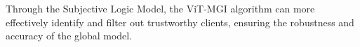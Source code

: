 \documentclass[conference]{IEEEtran}
\begin{document}

Through the Subjective Logic Model, the ViT-MGI algorithm can more effectively identify and filter out trustworthy clients, ensuring the robustness and accuracy of the global model.

                
                
                
                
\end{document}

